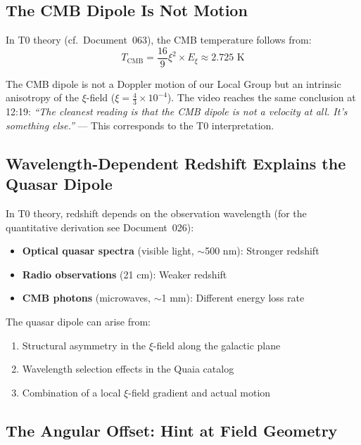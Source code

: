 	\subsection{The CMB Dipole Is Not Motion}

	In T0 theory (cf.\ Document~063), the CMB temperature follows from:
	$$T_{\text{CMB}} = \frac{16}{9} \xi^2 \times E_\xi \approx 2.725 \text{ K}$$

	The CMB dipole is not a Doppler motion of our Local Group but an intrinsic anisotropy of the $\xi$-field ($\xi = \frac{4}{3} \times 10^{-4}$). The video reaches the same conclusion at 12:19: \textit{``The cleanest reading is that the CMB dipole is not a velocity at all. It's something else.''} --- This corresponds to the T0 interpretation.

	\subsection{Wavelength-Dependent Redshift Explains the Quasar Dipole}

	In T0 theory, redshift depends on the observation wavelength (for the quantitative derivation see Document~026):
	\begin{itemize}
		\item \textbf{Optical quasar spectra} (visible light, $\sim$500 nm): Stronger redshift
		\item \textbf{Radio observations} (21 cm): Weaker redshift
		\item \textbf{CMB photons} (microwaves, $\sim$1 mm): Different energy loss rate
	\end{itemize}

	The quasar dipole can arise from:
	\begin{enumerate}
		\item Structural asymmetry in the $\xi$-field along the galactic plane
		\item Wavelength selection effects in the Quaia catalog \cite{storey2024}
		\item Combination of a local $\xi$-field gradient and actual motion
	\end{enumerate}

	\subsection{The Angular Offset: Hint at Field Geometry}

